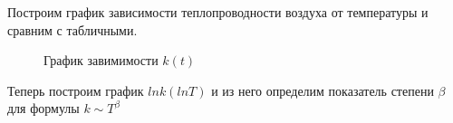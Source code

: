 \documentclass[a4paper, 12pt]{article}
\begin{document}
            Построим график зависимости теплопроводности воздуха от температуры и сравним с табличными.

            \begin{figure}[ht]
                \caption{График завимимости $k(t)$}
                \label{k_graph}
            \end{figure}

            Теперь построим график $ln k (lnT)$ и из него определим показатель степени $\beta$ для формулы $k \sim T^{\beta}$
\end{document}

